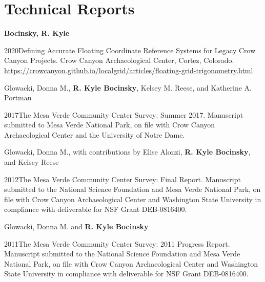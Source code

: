 \section{Technical Reports}

{\bf Bocinsky, R. Kyle}
\begin{list1}
\item[] 2020\hspace{.2cm}Defining Accurate Floating Coordinate Reference Systems for Legacy Crow Canyon Projects. Crow Canyon Archaeological Center, Cortez, Colorado. \\\href{https://crowcanyon.github.io/localgrid/articles/floating-grid-trigonometry.html}{https://crowcanyon.github.io/localgrid/articles/floating-grid-trigonometry.html}
\end{list1}


Glowacki, Donna M., {\bf R. Kyle Bocinsky}, Kelsey M. Reese, and Katherine A. Portman
\begin{list1}
\item[] 2017\hspace{.2cm}The Mesa Verde Community Center Survey: Summer 2017. Manuscript submitted to Mesa Verde National Park, on file with Crow Canyon Archaeological Center and the University of Notre Dame.
\end{list1}


Glowacki, Donna M., with contributions by Elise Alonzi, {\bf R. Kyle Bocinsky}, and Kelsey Reese
\begin{list1}
\item[] 2012\hspace{.2cm}The Mesa Verde Community Center Survey: Final Report. Manuscript submitted to the National Science Foundation and Mesa Verde National Park, on file with Crow Canyon Archaeological Center and Washington State University in compliance with deliverable for NSF Grant DEB-0816400.%
\end{list1}


Glowacki, Donna M. and {\bf R. Kyle Bocinsky}
\begin{list1}
\item[] 2011\hspace{.2cm}The Mesa Verde Community Center Survey: 2011 Progress Report. Manuscript submitted to the National Science Foundation and Mesa Verde National Park, on file with Crow Canyon Archaeological Center and Washington State University in compliance with deliverable for NSF Grant DEB-0816400.%
\end{list1}



